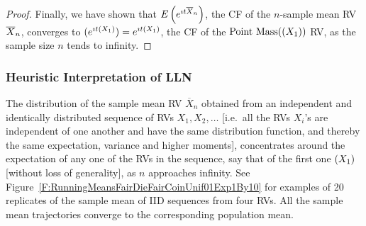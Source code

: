 \begin{prop}
{\begin{proof}
Finally, we have shown that $E \left( e^{\imath t \overline{X}_n}\right)$, the CF of the $n$-sample mean RV $\overline{X}_n$, converges to $\mathscr{(}e^{\imath t \mathscr{(}X_1)})=e^{\imath t \mathscr{(}X_1)}$, the CF of the $\mbox{{\rm Point~Mass}}(\mathscr{(}X_1))$ RV, as the sample size $n$ tends to infinity.
\end{proof}
}
\end{prop}


\subsubsection{Heuristic Interpretation of LLN}  
The distribution of the sample mean RV $\overline{X}_n$ obtained from an independent and identically distributed sequence of RVs $X_1,X_2,\ldots$ {\scriptsize [i.e.~all the RVs $X_i$'s are independent of one another and have the same distribution function, and thereby the same expectation, variance and higher moments]}, concentrates around the expectation of any one of the RVs in the sequence, say that of the first one $\mathscr{(}X_1)$ {\scriptsize [without loss of generality]}, as $n$ approaches infinity.  See Figure~\ref{F:RunningMeansFairDieFairCoinUnif01Exp1By10} for examples of 20 replicates of the sample mean of IID sequences from four RVs.  All the sample mean trajectories converge to the corresponding population mean. 

